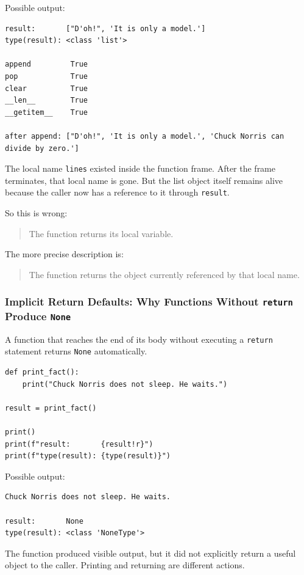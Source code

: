 Possible output:

\begin{verbatim}
result:       ["D'oh!", 'It is only a model.']
type(result): <class 'list'>

append         True
pop            True
clear          True
__len__        True
__getitem__    True

after append: ["D'oh!", 'It is only a model.', 'Chuck Norris can divide by zero.']
\end{verbatim}

The local name \texttt{lines} existed inside the function frame. After the frame terminates, that local name is gone. But the list object itself remains alive because the caller now has a reference to it through \texttt{result}.

So this is wrong:

\begin{quote}
The function returns its local variable.
\end{quote}

The more precise description is:

\begin{quote}
The function returns the object currently referenced by that local name.
\end{quote}

\subsubsection{Implicit Return Defaults: Why Functions Without \texttt{return} Produce \texttt{None}}

A function that reaches the end of its body without executing a \texttt{return} statement returns \texttt{None} automatically.

\begin{verbatim}
def print_fact():
    print("Chuck Norris does not sleep. He waits.")

result = print_fact()

print()
print(f"result:       {result!r}")
print(f"type(result): {type(result)}")
\end{verbatim}

Possible output:

\begin{verbatim}
Chuck Norris does not sleep. He waits.

result:       None
type(result): <class 'NoneType'>
\end{verbatim}

The function produced visible output, but it did not explicitly return a useful object to the caller. Printing and returning are different actions.


